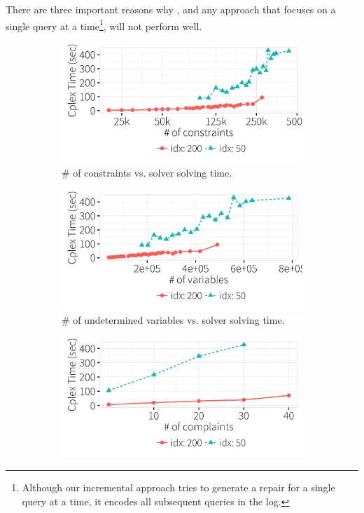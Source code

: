There are three important reasons why \dt, and any approach that focuses on a single query at a 
time\footnote{Although our incremental approach tries to generate a repair for a single
query at a time, it encodes all subsequent queries in the log.}, will not perform well.
  \begin{figure}[t]
  \centering
      \begin{subfigure} [t]{.3\textwidth}
    \includegraphics[width = .99\columnwidth]{figures/num_cons_time}
    \vspace*{-.25in}
    \caption{\# of constraints vs. solver solving time.}
    \vspace*{-.1in}
    \label{f:cons_vs_time} 
    \end{subfigure}
    \begin{subfigure} [t]{.3\textwidth}
    \includegraphics[width = .99\columnwidth]{figures/num_vars_time}
    \vspace*{-.25in}
    \caption{\# of undetermined variables vs. solver solving time.}
    \vspace*{-.1in}
    \label{f:var_vs_time} 
    \end{subfigure}
    \begin{subfigure} [t]{.3\textwidth}
    \includegraphics[width = .99\columnwidth]{figures/num_compl_time}

\end{subfigure}
\end{figure}
